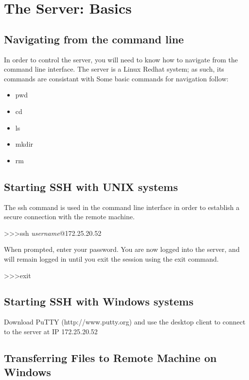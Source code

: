 \chapter{The Server: Basics}

\section{Navigating from the command line}
In order to control the server, you will need to know how to navigate from the command line interface. The server is a Linux Redhat system; as such, its commands are consistant with Some basic commands for navigation follow:
\begin{itemize}
\item pwd
\item cd
\item ls
\item mkdir
\item rm
\end{itemize}


\section{Starting SSH with UNIX systems}
The ssh command is used in the command line interface in order to establish a secure connection with the remote machine.\\

\begin{mdframed}
\textgreater \textgreater\textgreater \quad ssh \textit{username}@172.25.20.52
\end{mdframed}

When prompted, enter your password. You are now logged into the server, and will remain logged in until you exit the session using the exit command.\\

\begin{mdframed}
\textgreater\textgreater\textgreater \quad exit
\end{mdframed}

\section{Starting SSH with Windows systems}

Download PuTTY (http://www.putty.org) and use the desktop client to connect to the server at IP 172.25.20.52

\section{Transferring Files to Remote Machine on Windows}

